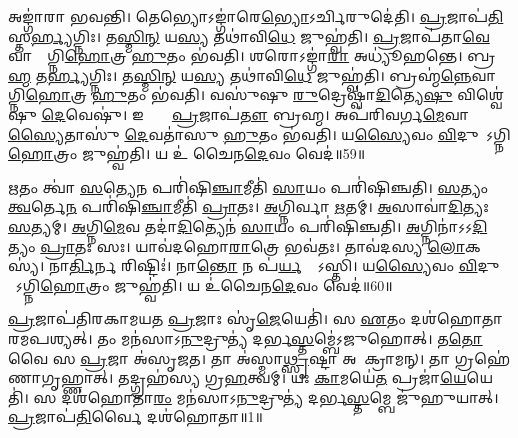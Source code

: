 𑌅𑌙𑍍𑌗𑌾॑𑌰𑌾 𑌭𑌵𑌨𑍍𑌤𑌿।
𑌤𑍇𑌭𑍍𑌯𑍋\-𑌽𑌙𑍍𑌗𑌾॑𑌰𑍇\ul{𑌭𑍍𑌯𑍋}\-𑌽𑌰𑍍𑌚𑌿𑌰𑍁𑌦𑍇॑𑌤𑌿।
\ul{𑌪𑍍𑌰}𑌜𑌾\-𑌪॑\ul{𑌤𑌿}\-𑌸𑍍𑌤\ul{𑌰𑍍𑌹𑍍𑌯}𑌗𑍍𑌨𑌿𑌃।
𑌤\ul{𑌸𑍍𑌮𑌿}\ul{𑌨𑍍} 𑌯\ul{𑌸𑍍𑌯} 𑌤𑌥𑌾॑𑌵𑌿\ul{𑌧𑍇} 𑌜𑍁𑌹𑍍𑌵॑𑌤𑌿।
\ul{𑌪𑍍𑌰}𑌜𑌾𑌪॑𑌤𑌾\ul{𑌵𑍇}𑌵𑌾𑌸𑍍𑌯𑌾᳚𑌗𑍍𑌨𑌿\ul{𑌹𑍋}𑌤𑍍𑌰 \ul{𑌹𑍁}𑌤𑌂 𑌭॑𑌵𑌤𑌿।
𑌶𑌰𑍋𑌽𑌙𑍍𑌗𑌾॑\ul{𑌰𑌾} 𑌅𑌧𑍍𑌯𑍂॑𑌹𑌨𑍍𑌤𑍇।
𑌬𑍍𑌰\ul{𑌹𑍍𑌮} 𑌤\ul{𑌰𑍍𑌹𑍍𑌯}𑌗𑍍𑌨𑌿𑌃।
𑌤\ul{𑌸𑍍𑌮𑌿}\ul{𑌨𑍍} 𑌯\ul{𑌸𑍍𑌯} 𑌤𑌥𑌾॑𑌵𑌿\ul{𑌧𑍇} 𑌜𑍁𑌹𑍍𑌵॑𑌤𑌿।
𑌬𑍍𑌰𑌹𑍍𑌮॑\ul{𑌨𑍍𑌨𑍇}𑌵𑌾𑌸𑍍𑌯𑌾᳚𑌗𑍍𑌨𑌿\ul{𑌹𑍋}𑌤𑍍𑌰 \ul{𑌹𑍁}𑌤𑌂 𑌭॑𑌵𑌤𑌿।
𑌵𑌸𑍁॑𑌷𑍁 \ul{𑌰𑍁}𑌦𑍍𑌰𑍇𑌷𑍍𑌵𑌾॑\ul{𑌦𑌿}𑌤𑍍𑌯𑍇\ul{𑌷𑍁} 𑌵𑌿𑌶𑍍𑌵𑍇॑𑌷𑍁 \ul{𑌦𑍇}𑌵𑍇𑌷𑍁॑।
𑌇𑌨𑍍𑌦𑍍𑌰𑍇᳚ \ul{𑌪𑍍𑌰}𑌜𑌾𑌪॑\ul{𑌤𑍗} 𑌬𑍍𑌰𑌹𑍍𑌮\sn{}।
𑌅𑌪॑𑌰𑌿𑌵𑌰𑍍𑌗\ul{𑌮𑍇}𑌵𑌾\ul{𑌸𑍍𑌯𑍈}𑌤𑌾𑌸𑍁॑ \ul{𑌦𑍇}𑌵𑌤𑌾॑𑌸𑍁 \ul{𑌹𑍁}𑌤𑌂 𑌭॑𑌵𑌤𑌿।
𑌯\ul{𑌸𑍍𑌯𑍈}𑌵𑌂 \ul{𑌵𑌿}𑌦𑍁𑌷𑍋᳚\-𑌽𑌗𑍍𑌨𑌿\ul{𑌹𑍋}𑌤𑍍𑌰𑌂 𑌜𑍁𑌹𑍍𑌵॑𑌤𑌿।
𑌯 𑌉॑ 𑌚𑍈𑌨\ul{𑌦𑍇}𑌵𑌂 𑌵𑍇𑌦॑॥59॥

\ul{𑌋}𑌤𑌂 𑌤𑍍𑌵𑌾॑ \ul{𑌸}𑌤𑍍𑌯𑍇\ul{𑌨} 𑌪𑌰𑌿॑𑌷𑌿\ul{𑌞𑍍𑌚𑌾}𑌮𑍀𑌤𑌿॑ \ul{𑌸𑌾}𑌯𑌂 𑌪𑌰𑌿॑𑌷𑌿𑌞𑍍𑌚𑌤𑌿।
\ul{𑌸}𑌤𑍍𑌯𑌂 \ul{𑌤𑍍𑌵}𑌰𑍍𑌤𑍇\ul{𑌨} 𑌪𑌰𑌿॑𑌷𑌿\ul{𑌞𑍍𑌚𑌾}𑌮𑍀𑌤𑌿॑ \ul{𑌪𑍍𑌰𑌾}𑌤𑌃।
\ul{𑌅}𑌗𑍍𑌨𑌿𑌰𑍍𑌵𑌾 \ul{𑌋}𑌤𑌮𑍍।
\ul{𑌅}𑌸𑌾𑌵𑌾॑\ul{𑌦𑌿}𑌤𑍍𑌯𑌃 \ul{𑌸}𑌤𑍍𑌯𑌮𑍍।
\ul{𑌅}𑌗𑍍𑌨𑌿\ul{𑌮𑍇}𑌵 𑌤𑌦𑌾॑\ul{𑌦𑌿}𑌤𑍍𑌯𑍇𑌨॑ \ul{𑌸𑌾}𑌯𑌂 𑌪𑌰𑌿॑𑌷𑌿𑌞𑍍𑌚𑌤𑌿।
\ul{𑌅}𑌗𑍍𑌨𑌿𑌨𑌾॑\-𑌽𑌽\ul{𑌦𑌿}𑌤𑍍𑌯𑌂 \ul{𑌪𑍍𑌰𑌾}𑌤𑌃 𑌸𑌃।
𑌯𑌾𑌵॑𑌦𑌹𑍋\ul{𑌰𑌾}𑌤𑍍𑌰𑍇 𑌭𑌵॑𑌤𑌃।
𑌤𑌾𑌵॑𑌦𑌸𑍍𑌯 \ul{𑌲𑍋}𑌕𑌸𑍍𑌯॑।
𑌨𑌾\ul{𑌰𑍍𑌤𑌿}𑌰𑍍𑌨 𑌰𑌿𑌷𑍍𑌟𑌿𑌃॑।
𑌨𑌾\ul{𑌨𑍍𑌤𑍋} 𑌨 𑌪॑\ul{𑌰𑍍𑌯}𑌨𑍍𑌤𑍋᳚\-𑌽𑌸𑍍𑌤𑌿।
𑌯\ul{𑌸𑍍𑌯𑍈}𑌵𑌂 \ul{𑌵𑌿}𑌦𑍁𑌷𑍋᳚\-𑌽𑌗𑍍𑌨𑌿\ul{𑌹𑍋}𑌤𑍍𑌰𑌂 𑌜𑍁𑌹𑍍𑌵॑𑌤𑌿।
𑌯 𑌉॑𑌚𑍈𑌨\ul{𑌦𑍇}𑌵𑌂 𑌵𑍇𑌦॑॥60॥\anuvakamend[\ul{𑌅}\ul{𑌸𑍍𑌤𑌿} 𑌦𑍍𑌵𑍇 𑌚॑]




\clearpage
{}
\setcounter{anuvakam}{0}

\ul{𑌪𑍍𑌰}𑌜𑌾𑌪॑𑌤𑌿𑌰𑌕𑌾𑌮𑌯𑌤 \ul{𑌪𑍍𑌰}𑌜𑌾𑌃 𑌸𑍃॑\ul{𑌜𑍇}𑌯𑍇𑌤𑌿॑।
𑌸 \ul{𑌏}𑌤𑌂 𑌦𑌶॑𑌹𑍋𑌤𑌾𑌰𑌮\-𑌪𑌶𑍍𑌯𑌤𑍍।
𑌤𑌂 𑌮𑌨॑𑌸𑌾\-𑌽\ul{𑌨𑍁}𑌦𑍍𑌰𑍁𑌤𑍍𑌯॑ 𑌦𑌰𑍍𑌭\ul{𑌸𑍍𑌤}𑌮𑍍𑌬𑍇॑\-𑌽𑌜𑍁𑌹𑍋𑌤𑍍।
𑌤\ul{𑌤𑍋} 𑌵𑍈 𑌸 \ul{𑌪𑍍𑌰}𑌜𑌾 𑌅॑𑌸𑍃𑌜𑌤।
𑌤𑌾 𑌅॑𑌸𑍍𑌮𑌾\ul{𑌥𑍍𑌸𑍃}𑌷𑍍𑌟𑌾 𑌅𑌪𑌾᳚𑌕𑍍𑌰𑌾𑌮𑌨𑍍।
𑌤𑌾 𑌗𑍍𑌰𑌹𑍇॑𑌣𑌾𑌗𑍃𑌹𑍍𑌣𑌾𑌤𑍍।
𑌤𑌦𑍍𑌗𑍍𑌰𑌹॑𑌸𑍍𑌯 𑌗𑍍𑌰\ul{𑌹}𑌤𑍍𑌵𑌮𑍍।
𑌯𑌃 \ul{𑌕𑌾}𑌮𑌯𑍇॑\ul{𑌤} 𑌪𑍍𑌰𑌜𑌾॑\ul{𑌯𑍇}𑌯𑍇𑌤𑌿॑।
𑌸 𑌦𑌶॑𑌹𑍋𑌤𑌾\ul{𑌰𑌂} 𑌮𑌨॑𑌸𑌾\-𑌽\ul{𑌨𑍁}𑌦𑍍𑌰𑍁𑌤𑍍𑌯॑ 𑌦𑌰𑍍𑌭\ul{𑌸𑍍𑌤}𑌮𑍍𑌬𑍇 𑌜𑍁॑𑌹𑍁𑌯𑌾𑌤𑍍।
\ul{𑌪𑍍𑌰}𑌜𑌾𑌪॑\ul{𑌤𑌿}𑌰𑍍𑌵𑍈 𑌦𑌶॑𑌹𑍋𑌤𑌾॥1॥

